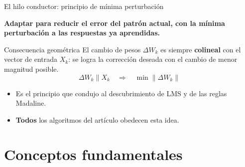 \documentclass[aspectratio=169, 11pt, xcolor={dvipsnames,table}]{beamer}
\newcommand{\azul}[1]{\textcolor{UsachAzul}{#1}}
\begin{document}
\begin{frame}{El hilo conductor: principio de mínima perturbación}
\begin{ideaclave}
\textbf{Adaptar para reducir el error del patrón actual, con la mínima perturbación a las
respuestas ya aprendidas.}
\end{ideaclave}
\begin{block}{Consecuencia geométrica}
El cambio de pesos $\Delta W_k$ es siempre \textbf{colineal} con el vector de entrada $X_k$: se logra
la corrección deseada con el cambio de \azul{menor magnitud posible}.
\[
  \Delta W_k \parallel X_k \quad\Longrightarrow\quad \min \lVert \Delta W_k \rVert
\]
\end{block}
\begin{itemize}
  \item Es el principio que condujo al descubrimiento de LMS y de las reglas Madaline.
  \item \textbf{Todos} los algoritmos del artículo obedecen esta idea.
\end{itemize}
\end{frame}

\section{Conceptos fundamentales}
\end{document}
